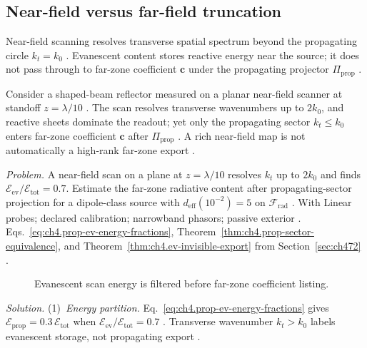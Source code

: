 \subsection{Near-field versus far-field truncation}
\label{sec:ch4103}
Near-field scanning resolves transverse spatial spectrum beyond the propagating circle $k_{t}=k_{0}$ \cite{stratton1941}. Evanescent content stores reactive energy near the source; it does not pass through to far-zone coefficient $\mathbf{c}$ under the propagating projector $\Pi_{\mathrm{prop}}$ \cite{harrington2001}.
\begin{physicalvignette}
Consider a shaped-beam reflector measured on a planar near-field scanner at standoff $z=\lambda/10$ \cite{hansen1988}. The scan resolves transverse wavenumbers up to $2k_{0}$, and reactive sheets dominate the readout; yet only the propagating sector $k_{t}\le k_{0}$ enters far-zone coefficient $\mathbf{c}$ after $\Pi_{\mathrm{prop}}$ \cite{stratton1941}. A rich near-field map is not automatically a high-rank far-zone export \cite{devaney2004}.
\end{physicalvignette}
\emph{Problem.} A near-field scan on a plane at $z=\lambda/10$ resolves $k_{t}$ up to $2k_{0}$ and finds $\mathcal{E}_{\mathrm{ev}}/\mathcal{E}_{\mathrm{tot}}=0.7$. Estimate the far-zone radiative content after propagating-sector projection for a dipole-class source with $d_{\mathrm{eff}}(10^{-2})=5$ on $\mathcal{F}_{\mathrm{rad}}$ .
With Linear probes; declared calibration; narrowband phasors; passive exterior . Eqs.~\eqref{eq:ch4.prop-ev-energy-fractions}, Theorem~\ref{thm:ch4.prop-sector-equivalence}, and Theorem~\ref{thm:ch4.ev-invisible-export} from Section~\ref{sec:ch472} .
\begin{figure}[t]
\centering
{}
\caption{Evanescent scan energy is filtered before far-zone coefficient listing.}
\label{fig:ch4.ex-nf-ff-truncation}
\end{figure}
\emph{Solution.} (1)~\emph{Energy partition.} Eq.~\eqref{eq:ch4.prop-ev-energy-fractions} gives $\mathcal{E}_{\mathrm{prop}}=0.3\,\mathcal{E}_{\mathrm{tot}}$ when $\mathcal{E}_{\mathrm{ev}}/\mathcal{E}_{\mathrm{tot}}=0.7$ . Transverse wavenumber $k_{t}>k_{0}$ labels evanescent storage, not propagating export .
